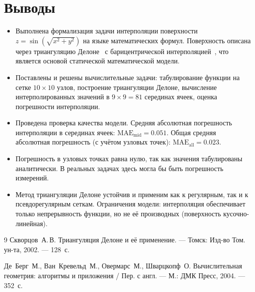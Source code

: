 \documentclass[a4paper, 14pt]{extarticle}
\begin{document}
\section{Выводы}
\begin{itemize}
  \item Выполнена формализация задачи интерполяции поверхности $z = \sin\!\left(\sqrt{x^2 + y^2}\right)$ на языке математических формул. Поверхность описана через триангуляцию Делоне~\cite{skvortsov2002} с барицентрической интерполяцией~\cite{deberg2004}, что является основой статической математической модели.
  
  \item Поставлены и решены вычислительные задачи: табулирование функции на сетке $10 \times 10$ узлов, построение триангуляции Делоне, вычисление интерполированных значений в $9 \times 9 = 81$ серединах ячеек, оценка погрешности интерполяции.
  
  \item Проведена проверка качества модели. Средняя абсолютная погрешность интерполяции в серединах ячеек: $\text{MAE}_{\text{mid}} = 0.051$. Общая средняя абсолютная погрешность (с учётом узловых точек): $\text{MAE}_{\text{all}} = 0.023$.
  
  \item Погрешность в узловых точках равна нулю, так как значения табулированы аналитически. В реальных задачах здесь могла бы быть погрешность измерений.
  
  \item Метод триангуляции Делоне устойчив и применим как к регулярным, так и к псевдорегулярным сеткам. Ограничения модели: интерполяция обеспечивает только непрерывность функции, но не её производных (поверхность кусочно-линейная).
\end{itemize}

\begin{thebibliography}{9}
Скворцов~А.\,В. Триангуляция Делоне и её применение. --- Томск: Изд-во Том. ун-та, 2002. --- 128~с.

Де~Берг~М., Ван~Кревельд~М., Овермарс~М., Шварцкопф~О. Вычислительная геометрия: алгоритмы и приложения / Пер. с англ. --- М.: ДМК Пресс, 2004. --- 352~с.
\end{thebibliography}
\end{document}
